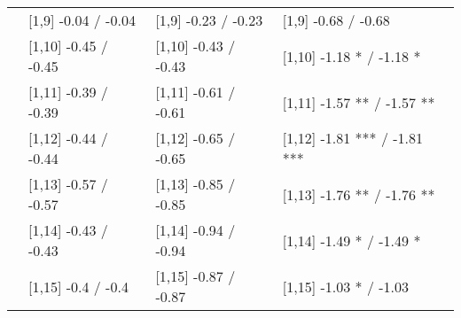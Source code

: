 \begin{table}
\begin{tabular}[t]{llll}
 & {}[1,9] -0.04  / -0.04 & {}[1,9] -0.23  / -0.23 & {}[1,9] -0.68  / -0.68\\
 & {}[1,10] -0.45  / -0.45 & {}[1,10] -0.43  / -0.43 & {}[1,10] -1.18 * / -1.18 *\\
 & {}[1,11] -0.39  / -0.39 & {}[1,11] -0.61  / -0.61 & {}[1,11] -1.57 ** / -1.57 **\\
 & {}[1,12] -0.44  / -0.44 & {}[1,12] -0.65  / -0.65 & {}[1,12] -1.81 *** / -1.81 ***\\
\addlinespace
 & {}[1,13] -0.57  / -0.57 & {}[1,13] -0.85  / -0.85 & {}[1,13] -1.76 ** / -1.76 **\\
 & {}[1,14] -0.43  / -0.43 & {}[1,14] -0.94  / -0.94 & {}[1,14] -1.49 * / -1.49 *\\
 & {}[1,15] -0.4  / -0.4 & {}[1,15] -0.87  / -0.87 & {}[1,15] -1.03 * / -1.03\\
\bottomrule
\end{tabular}
\end{table}
